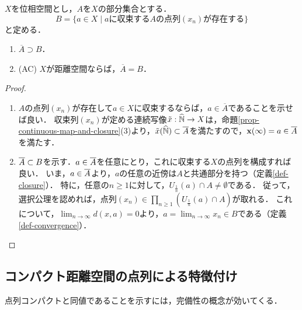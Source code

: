 \documentclass[uplatex,dvipdfmx]{jsreport}
\begin{document}
\begin{corollary}[点列による閉包の特徴付け]\label{cor-characterization-of-closure-in-terms-of-limits}
    $X$を位相空間とし，$A$を$X$の部分集合とする．
    \[ B=\{a\in X\mid aに収束するAの点列(x_n)が存在する\} \]
    と定める．
    \begin{enumerate}
        \item $\overline{A}\supset B$．
        \item (AC) $X$が距離空間ならば，$\overline{A}=B$．
    \end{enumerate}
\end{corollary}
\begin{proof}\mbox{}
    \begin{enumerate}
        \item $A$の点列$(x_n)$が存在して$a\in X$に収束するならば，$a\in\overline{A}$であることを示せば良い．
        収束列$(x_n)$が定める連続写像$\tilde{x}:\widehat{\mathbb{N}}\to X$は，命題\ref{prop-continuous-map-and-closure}(3)より，$\tilde{x}(\widehat{\mathbb{N}})\subset\overline{A}$を満たすので，$\mathbf{x}(\infty)=a\in\overline{A}$を満たす．
        \item 
        $\overline{A}\subset B$を示す．$a\in\overline{A}$を任意にとり，これに収束する$X$の点列を構成すれば良い．
        いま，$a\in\overline{A}$より，$a$の任意の近傍は$A$と共通部分を持つ（定義\ref{def-closure}）．
        特に，任意の$n\ge 1$に対して，$U_{\frac{1}{n}}(a)\cap A\ne\emptyset$である．
        従って，選択公理を認めれば，点列$(x_n)\in\prod_{n\ge 1}(U_{\frac{1}{n}}(a)\cap A)$が取れる．
        これについて，$\lim_{n\to\infty}d(x,a)=0$より，$a=\lim_{n\to\infty}x_n\in B$である（定義\ref{def-convergence}）．
    \end{enumerate}
\end{proof}

\subsection{コンパクト距離空間の点列による特徴付け}

\begin{tcolorbox}[colframe=ForestGreen, colback=ForestGreen!10!white,breakable,colbacktitle=ForestGreen!40!white,coltitle=black,fonttitle=\bfseries\sffamily,
title=]
    点列コンパクトと同値であることを示すには，完備性の概念が効いてくる．
\end{tcolorbox}
\end{document}

